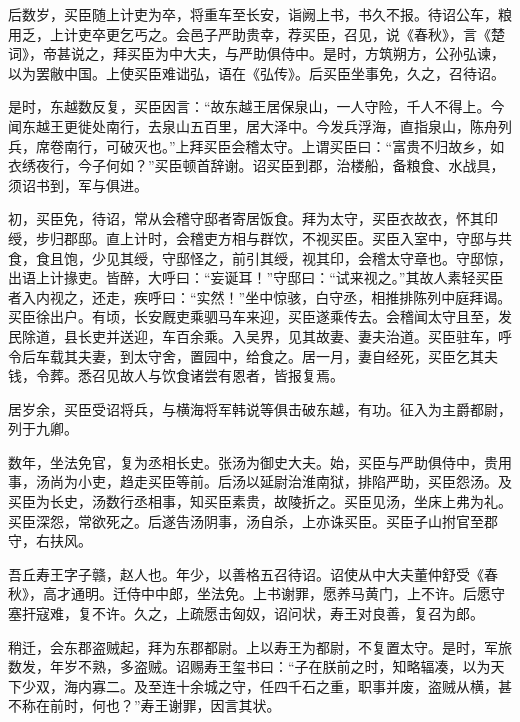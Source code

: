 \documentclass[12pt,UTF8]{ctexbook}
\begin{document}
后数岁，买臣随上计吏为卒，将重车至长安，诣阙上书，书久不报。待诏公车，粮用乏，上计吏卒更乞丐之。会邑子严助贵幸，荐买臣，召见，说《春秋》，言《楚词》，帝甚说之，拜买臣为中大夫，与严助俱侍中。是时，方筑朔方，公孙弘谏，以为罢敝中国。上使买臣难诎弘，语在《弘传》。后买臣坐事免，久之，召待诏。



是时，东越数反复，买臣因言：“故东越王居保泉山，一人守险，千人不得上。今闻东越王更徙处南行，去泉山五百里，居大泽中。今发兵浮海，直指泉山，陈舟列兵，席卷南行，可破灭也。”上拜买臣会稽太守。上谓买臣曰：“富贵不归故乡，如衣绣夜行，今子何如？”买臣顿首辞谢。诏买臣到郡，治楼船，备粮食、水战具，须诏书到，军与俱进。



初，买臣免，待诏，常从会稽守邸者寄居饭食。拜为太守，买臣衣故衣，怀其印绶，步归郡邸。直上计时，会稽吏方相与群饮，不视买臣。买臣入室中，守邸与共食，食且饱，少见其绶，守邸怪之，前引其绶，视其印，会稽太守章也。守邸惊，出语上计掾吏。皆醉，大呼曰：“妄诞耳！”守邸曰：“试来视之。”其故人素轻买臣者入内视之，还走，疾呼曰：“实然！”坐中惊骇，白守丞，相推排陈列中庭拜谒。买臣徐出户。有顷，长安厩吏乘驷马车来迎，买臣遂乘传去。会稽闻太守且至，发民除道，县长吏并送迎，车百余乘。入吴界，见其故妻、妻夫治道。买臣驻车，呼令后车载其夫妻，到太守舍，置园中，给食之。居一月，妻自经死，买臣乞其夫钱，令葬。悉召见故人与饮食诸尝有恩者，皆报复焉。



居岁余，买臣受诏将兵，与横海将军韩说等俱击破东越，有功。征入为主爵都尉，列于九卿。



数年，坐法免官，复为丞相长史。张汤为御史大夫。始，买臣与严助俱侍中，贵用事，汤尚为小吏，趋走买臣等前。后汤以延尉治淮南狱，排陷严助，买臣怨汤。及买臣为长史，汤数行丞相事，知买臣素贵，故陵折之。买臣见汤，坐床上弗为礼。买臣深怨，常欲死之。后遂告汤阴事，汤自杀，上亦诛买臣。买臣子山拊官至郡守，右扶风。



吾丘寿王字子赣，赵人也。年少，以善格五召待诏。诏使从中大夫董仲舒受《春秋》，高才通明。迁侍中中郎，坐法免。上书谢罪，愿养马黄门，上不许。后愿守塞扞寇难，复不许。久之，上疏愿击匈奴，诏问状，寿王对良善，复召为郎。



稍迁，会东郡盗贼起，拜为东郡都尉。上以寿王为都尉，不复置太守。是时，军旅数发，年岁不熟，多盗贼。诏赐寿王玺书曰：“子在朕前之时，知略辐凑，以为天下少双，海内寡二。及至连十余城之守，任四千石之重，职事并废，盗贼从横，甚不称在前时，何也？”寿王谢罪，因言其状。
\end{document}
